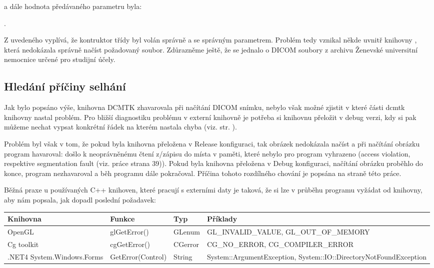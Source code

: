 a dále hodnota předávaného parametru  byla:

.

Z uvedeného vyplívá, že kontruktor třídy byl volán správně a se správným parametrem. Problém tedy vznikal někde uvnitř knihovny , která nedokázala správně načíst požadovaný soubor. Zdůrazněme ještě, že se jednalo o DICOM soubory z archivu Ženevské universitní nemocnice určené pro studijní účely.

\subsection{Hledání příčiny selhání}
Jak bylo popsáno výše, knihovna DCMTK zhavarovala při načítání DICOM snímku, nebylo však možné zjistit v které části dcmtk knihovny nastal problém. Pro bližší diagnostiku problému v externí knihovně je potřeba si knihovnu přeložit v debug verzi, kdy si pak můžeme nechat vypsat konkrétní řádek na kterém nastala chyba (viz. str. \pageref{releasedebug}).

Problém byl však v tom, že pokud byla knihovna přeložena v Release konfiguraci, tak obrázek nedokázala načíst a při načítání obrázku program havaroval: došlo k neoprávněnému čtení z/zápisu do místa v paměti, které nebylo pro program vyhrazeno (access violation, respektive segmentation fault (viz. práce \cite{flaska} strana 39)). Pokud byla knihovna přeložena v Debug konfiguraci, načítání obrázku proběhlo do konce, program nezhavaroval a běh programu dále pokračoval. Příčina tohoto rozdílného chování je popsána na straně \pageref{releasedebug} této práce.

Běžná praxe u používaných C++ knihoven, které pracují s externími daty je taková, že si lze v průběhu programu vyžádat od knihovny, aby nám popsala, jak dopadl poslední požadavek:

\hspace{-1cm}
\begin{tabular}{| p{3cm} | p{3cm} | p{2cm} | p{6cm} | }
  \hline                       
  Knihovna & Funkce & Typ & Příklady \\
  \hline
  \hline                     
  OpenGL & glGetError() & GLenum & GL\_INVALID\_VALUE, GL\_OUT\_OF\_MEMORY\\
  \hline
  Cg toolkit & cgGetError()  & CGerror & CG\_NO\_ERROR, CG\_COMPILER\_ERROR\\
  \hline
  .NET4 System\-.Windows\-.Forms & GetError(Control) & String & System\-::Argument\-Exception, System::IO\-::Directory\-NotFound\-Exception\\
  \hline
\end{tabular}


